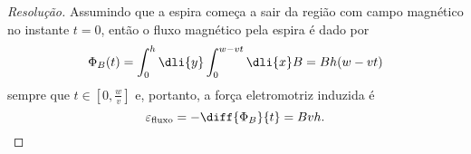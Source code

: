 \begin{proof}[Resolução]

    Assumindo que a espira começa a sair da região com campo magnético no instante \(t = 0\), então o fluxo magnético pela espira é dado por
    \begin{equation*}
        \Phi_B(t) = \int_0^h \dli{y} \int_0^{w - v t} \dli{x} B = B h (w - v t)
    \end{equation*}
    sempre que \(t \in [0, \frac{w}{v}]\) e, portanto, a força eletromotriz induzida é
    \begin{equation*}
        \varepsilon_\mathrm{fluxo} = - \diff{\Phi_B}{t} = Bvh.
    \end{equation*}


\end{proof}
